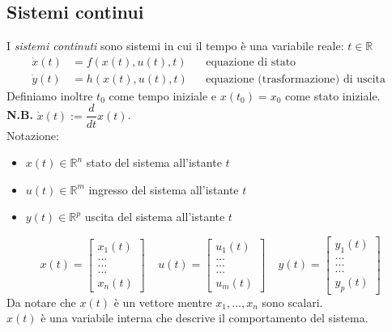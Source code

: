 \documentclass{article}
\numberwithin{equation}{subsection}
\let\oldsubsection\subsection%
\renewcommand{\subsection}{%
  \renewcommand{\theequation}{\thesubsection.\arabic{equation}}%
  \oldsubsection}%
\begin{document}
\subsection{Sistemi continui}
I \textit{sistemi continuti} sono sistemi in cui il tempo è una variabile reale: $t \in \mathbb{R}$
\begin{align*}
    \dot x(t) &= f \left( x(t), u(t), t \right) & &\text{equazione di stato}\\
    \dot y(t) &= h\left(x(t), u(t), t\right) & &\text{equazione  (trasformazione) di uscita }
\end{align*}
Definiamo inoltre $t_0$ come tempo iniziale e $x(t_0)=x_0$ come stato iniziale. \\
\textbf{N.B.} $\dot x(t) := \dfrac{d}{dt}x(t)$.
\vspace*{0.1cm}\\
Notazione:
\begin{itemize}
    \item $x(t) \in \mathbb{R}^n$ stato del sistema all'istante $t$
    \item $u(t) \in \mathbb{R}^m$ ingresso del sistema all'istante $t$
    \item $y(t) \in \mathbb{R}^p$ uscita del sistema all'istante $t$
\end{itemize}
\begin{equation}
    x(t)=
    \begin{bmatrix}
        x_1(t)\\
        ...\\
        ...\\
        ...\\
        x_n(t)
    \end{bmatrix}
    \ \ \ \ \ 
    u(t) =
    \begin{bmatrix}
        u_1(t)\\
        ...\\
        ...\\
        ...\\
        u_m(t)
    \end{bmatrix}
    \ \ \ \ \ 
    y(t) = 
    \begin{bmatrix}
        y_1(t)\\
        ...\\
        ...\\
        ...\\
        y_p(t)
    \end{bmatrix}
\end{equation}
Da notare che $x(t)$ è un vettore mentre $x_1,...,x_n$ sono scalari.\\
$x(t)$ è una variabile interna che descrive il comportamento del sistema.
\end{document}
